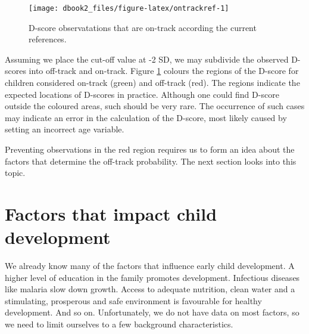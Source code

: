 \documentclass[
]{book}
\begin{document}
\begin{figure}

{\centering \texttt{[image: dbook2\_files/figure-latex/ontrackref-1]} 

}

\caption{D-score observatations that are on-track according the current references.}\label{fig:ontrackref}
\end{figure}



Assuming we place the cut-off value at -2 SD, we may subdivide the observed D-scores into off-track and on-track. Figure \ref{fig:ontrackref} colours the regions of the D-score for children considered on-track (green) and off-track (red). The regions indicate the expected locations of D-scores in practice. Although one could find D-score outside the coloured areas, such should be very rare. The occurrence of such cases may indicate an error in the calculation of the D-score, most likely caused by setting an incorrect age variable.

Preventing observations in the red region requires us to form an idea about the factors that determine the off-track probability. The next section looks into this topic.

\hypertarget{sec:factors}{%
\section{Factors that impact child development}\label{sec:factors}}

We already know many of the factors that influence early child development. A higher level of education in the family promotes development. Infectious diseases like malaria slow down growth. Access to adequate nutrition, clean water and a stimulating, prosperous and safe environment is favourable for healthy development. And so on. Unfortunately, we do not have data on most factors, so we need to limit ourselves to a few background characteristics.
\end{document}
